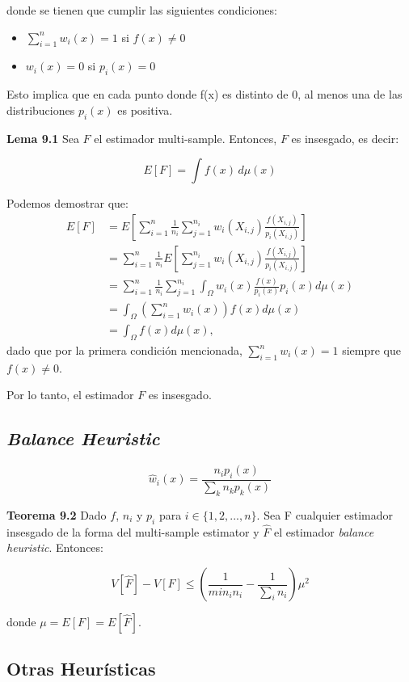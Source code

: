 \documentclass{article}
\begin{document}
donde se tienen que cumplir las siguientes condiciones:

\begin{itemize}
    \item $\sum_{i=1}^{n} w_{i}(x) = 1$ si $f(x) \neq 0$
    \item $w_{i}(x) = 0$ si $p_{i}(x) = 0$
\end{itemize}

Esto implica que en cada punto donde f(x) es distinto de 0, al menos una de las distribuciones $p_{i}(x)$ es positiva.

\textbf{Lema 9.1} Sea $F$ el estimador multi-sample. Entonces, $F$ es insesgado, es decir:

$$E[F] = \int f(x) \,d\mu(x)$$

Podemos demostrar que:
\begin{align*}
E[F] &= E\left[\sum_{i=1}^n \frac{1}{n_i} \sum_{j=1}^{n_i} w_i(X_{i,j}) \frac{f(X_{i,j})}{p_i(X_{i,j})}\right] \\
&= \sum_{i=1}^n \frac{1}{n_i} E\left[\sum_{j=1}^{n_i} w_i(X_{i,j}) \frac{f(X_{i,j})}{p_i(X_{i,j})}\right] \\
&= \sum_{i=1}^n \frac{1}{n_i} \sum_{j=1}^{n_i} \int_{\Omega} w_i(x) \frac{f(x)}{p_i(x)} p_i(x) d\mu(x) \\
&= \int_{\Omega} \left(\sum_{i=1}^n w_i(x)\right) f(x) d\mu(x) \\
&= \int_{\Omega} f(x) d\mu(x),
\end{align*}
dado que por la primera condición mencionada, \( \sum_{i=1}^n w_i(x) = 1 \) siempre que \( f(x) \neq 0 \).

Por lo tanto, el estimador \( F \) es insesgado.

\subsection{\textit{Balance Heuristic}}

$$ \hat{w}_{i}(x) = \frac{n_{i} p_{i}(x)}{\sum_{k} n_{k} p_{k}(x)}$$

\textbf{Teorema 9.2} Dado $f$, $n_{i}$ y $p_{i}$ para $i \in \{1, 2, ..., n\}$. Sea F cualquier estimador insesgado de la forma del multi-sample estimator y $\hat{F}$ el estimador \textit{balance heuristic}. Entonces:

$$V[\hat{F}] - V[F] \leq ( \frac{1}{min_{i} n_{i}} - \frac{1}{\sum_{i} n_{i}} ) \mu^{2}$$

donde $\mu = E[F] = E[\hat{F}]$.

\subsection{Otras Heurísticas}
\end{document}

